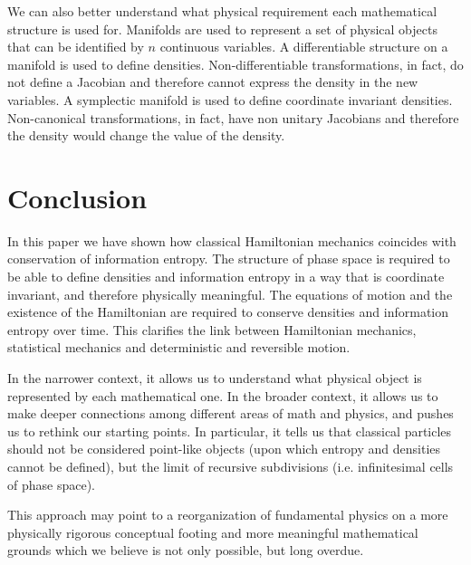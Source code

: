 \documentclass[11pt]{article}
\begin{document}
We can also better understand what physical requirement each mathematical structure is used for. Manifolds are used to represent a set of physical objects that can be identified by $n$ continuous variables.  A differentiable structure on a manifold is used to define densities. Non-differentiable transformations, in fact, do not define a Jacobian and therefore cannot express the density in the new variables. A symplectic manifold is used to define coordinate invariant densities. Non-canonical transformations, in fact, have non unitary Jacobians and therefore the density would change the value of the density.

\section{Conclusion}

In this paper we have shown how classical Hamiltonian mechanics coincides with conservation of information entropy. The structure of phase space is required to be able to define densities and information entropy in a way that is coordinate invariant, and therefore physically meaningful. The equations of motion and the existence of the Hamiltonian are required to conserve densities and information entropy over time. This clarifies the link between Hamiltonian mechanics, statistical mechanics and deterministic and reversible motion.

In the narrower context, it allows us to understand what physical object is represented by each mathematical one. In the broader context, it allows us to make deeper connections among different areas of math and physics, and pushes us to rethink our starting points. In particular, it tells us that classical particles should not be considered point-like objects (upon which entropy and densities cannot be defined), but the limit of recursive subdivisions (i.e. infinitesimal cells of phase space).


This approach may point to a reorganization of fundamental physics on a more physically rigorous conceptual footing and more meaningful mathematical grounds which we believe is not only possible, but long overdue.



{}
\end{document}
